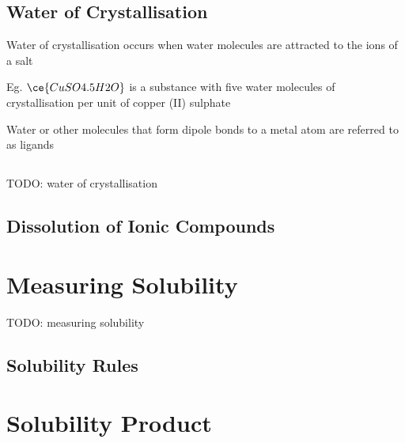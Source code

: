 	\subsection{Water of Crystallisation}
		Water of crystallisation occurs when water molecules are attracted to the ions of a salt

		Eg. $\ce{CuSO4 . 5H2O}$ is a substance with five water molecules of crystallisation per unit of copper (II) sulphate

		Water or other molecules that form dipole bonds to a metal atom are referred to as ligands

	\subsection{} TODO: water of crystallisation

	\subsection{Dissolution of Ionic Compounds}

\section{Measuring Solubility} \label{20/11/2024} TODO: measuring solubility
	\subsection{Solubility Rules}

\section{Solubility Product}
